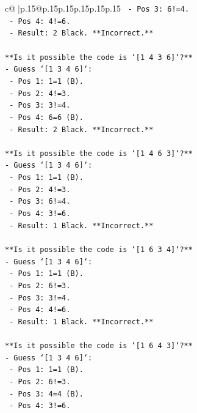 \documentclass{article}
\begin{document}
{\begin{supertabular}{c@{$\;$}|p{.15\linewidth}@{}p{.15\linewidth}p{.15\linewidth}p{.15\linewidth}p{.15\linewidth}p{.15\linewidth}}
{{{\texttt{    {-}   Pos 3: 6!=4.} \\
\texttt{    {-}   Pos 4: 4!=6.} \\
\texttt{    {-}   Result: 2 Black. **Incorrect.**} \\
\\ 
\texttt{**Is it possible the code is `{[}1 4 3 6{]}`?**} \\
\texttt{{-}   Guess `{[}1 3 4 6{]}`:} \\
\texttt{    {-}   Pos 1: 1=1 (B).} \\
\texttt{    {-}   Pos 2: 4!=3.} \\
\texttt{    {-}   Pos 3: 3!=4.} \\
\texttt{    {-}   Pos 4: 6=6 (B).} \\
\texttt{    {-}   Result: 2 Black. **Incorrect.**} \\
\\ 
\texttt{**Is it possible the code is `{[}1 4 6 3{]}`?**} \\
\texttt{{-}   Guess `{[}1 3 4 6{]}`:} \\
\texttt{    {-}   Pos 1: 1=1 (B).} \\
\texttt{    {-}   Pos 2: 4!=3.} \\
\texttt{    {-}   Pos 3: 6!=4.} \\
\texttt{    {-}   Pos 4: 3!=6.} \\
\texttt{    {-}   Result: 1 Black. **Incorrect.**} \\
\\ 
\texttt{**Is it possible the code is `{[}1 6 3 4{]}`?**} \\
\texttt{{-}   Guess `{[}1 3 4 6{]}`:} \\
\texttt{    {-}   Pos 1: 1=1 (B).} \\
\texttt{    {-}   Pos 2: 6!=3.} \\
\texttt{    {-}   Pos 3: 3!=4.} \\
\texttt{    {-}   Pos 4: 4!=6.} \\
\texttt{    {-}   Result: 1 Black. **Incorrect.**} \\
\\ 
\texttt{**Is it possible the code is `{[}1 6 4 3{]}`?**} \\
\texttt{{-}   Guess `{[}1 3 4 6{]}`:} \\
\texttt{    {-}   Pos 1: 1=1 (B).} \\
\texttt{    {-}   Pos 2: 6!=3.} \\
\texttt{    {-}   Pos 3: 4=4 (B).} \\
\texttt{    {-}   Pos 4: 3!=6.} \\
}}}
\end{supertabular}}
\end{document}
